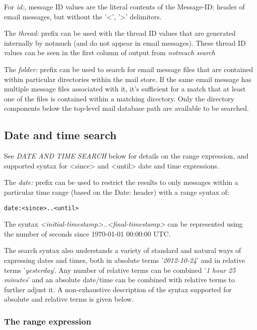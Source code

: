 \documentclass[a4,onecolumn,portrait]{article}
\begin{document}
For \emph{id:}, message ID values are the literal contents of the Message-ID: header of email messages, but without the '<', '>' delimiters.

The \emph{thread:} prefix can be used with the thread ID values that are generated internally by notmuch (and do not appear in email messages).  These thread ID values can be seen in the first column of output from \emph{notmuch search}

The \emph{folder:} prefix can be used to search for email message files that are contained within particular directories within the mail store. If the same email message has multiple message files associated with it, it's sufficient for a match that at least one of the files is contained within a matching directory. Only the directory components below the top-level mail database path are available to be searched.

\subsection{Date and time search}
\label{sec-7-3}

See \emph{DATE AND TIME SEARCH} below for details on the range expression,
and supported syntax for <since> and <until> date and time expressions.

The \emph{date:} prefix can be used to restrict the results to only messages within a particular time range (based on the Date: header) with a range syntax of:

\begin{verbatim}
date:<since>..<until>
\end{verbatim}

The syntax \emph{<initial-timestamp>..<final-timestamp>} can be represented using the number of seconds since 1970-01-01 00:00:00 UTC.

The search syntax also understands a variety of standard and natural ways of expressing dates and times, both in absolute terms '\emph{2012-10-24}' and in relative terms '\emph{yesterday}'. Any number of relative terms can be combined '\emph{1 hour 25 minutes}' and an absolute date/time can be combined with relative terms to further adjust it. A non-exhaustive description of the syntax supported for absolute and relative terms is given below.

\subsubsection{The range expression}
\label{sec-7-3-1}
\end{document}
